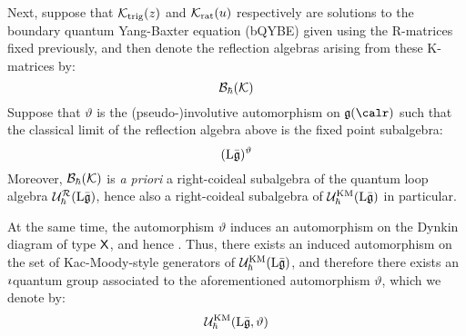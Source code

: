             Next, suppose that $\mathcal{K}_{\mathrm{trig}}(z)$ and $\mathcal{K}_{\mathrm{rat}}(u)$ respectively are solutions to the boundary quantum Yang-Baxter equation (bQYBE) given using the R-matrices fixed previously, and then denote the reflection algebras arising from these K-matrices by:
                $$\mathcal{B}_{\hbar}(\mathcal{K})$$
            Suppose that $\vartheta$ is the (pseudo-)involutive automorphism on $\g(\calr)$ such that the classical limit of the reflection algebra above is the fixed point subalgebra:
                $$(\mathrm{L} \bar{\mathfrak{g}})^{\vartheta}$$
            Moreover, $\mathcal{B}_{\hbar}(\mathcal{K})$ is \textit{a priori} a right-coideal subalgebra of the quantum loop algebra $\mathcal{U}_{\hbar}^{\mathcal{R}}(\mathrm{L} \bar{\mathfrak{g}})$, hence also a right-coideal subalgebra of $\mathcal{U}_{\hbar}^{\mathrm{KM}}(\mathrm{L} \bar{\mathfrak{g}})$ in particular.

            At the same time, the automorphism $\vartheta$ induces an automorphism on the Dynkin diagram of type $\mathsf{X}$, and hence . Thus, there exists an induced automorphism on the set of Kac-Moody-style generators of $\mathcal{U}_{\hbar}^{\mathrm{KM}}(\mathrm{L} \bar{\mathfrak{g}})$, and therefore there exists an $\imath$quantum group associated to the aforementioned automorphism $\vartheta$, which we denote by:
                $$\mathcal{U}_{\hbar}^{\mathrm{KM}}(\mathrm{L} \bar{\mathfrak{g}}, \vartheta)$$
            

